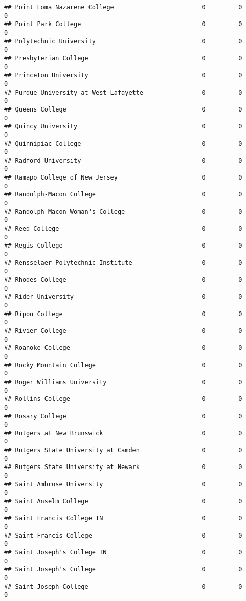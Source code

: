 \documentclass[
]{article}
\begin{document}
\begin{verbatim}
## Point Loma Nazarene College                        0         0         0
## Point Park College                                 0         0         0
## Polytechnic University                             0         0         0
## Presbyterian College                               0         0         0
## Princeton University                               0         0         0
## Purdue University at West Lafayette                0         0         0
## Queens College                                     0         0         0
## Quincy University                                  0         0         0
## Quinnipiac College                                 0         0         0
## Radford University                                 0         0         0
## Ramapo College of New Jersey                       0         0         0
## Randolph-Macon College                             0         0         0
## Randolph-Macon Woman's College                     0         0         0
## Reed College                                       0         0         0
## Regis College                                      0         0         0
## Rensselaer Polytechnic Institute                   0         0         0
## Rhodes College                                     0         0         0
## Rider University                                   0         0         0
## Ripon College                                      0         0         0
## Rivier College                                     0         0         0
## Roanoke College                                    0         0         0
## Rocky Mountain College                             0         0         0
## Roger Williams University                          0         0         0
## Rollins College                                    0         0         0
## Rosary College                                     0         0         0
## Rutgers at New Brunswick                           0         0         0
## Rutgers State University at Camden                 0         0         0
## Rutgers State University at Newark                 0         0         0
## Saint Ambrose University                           0         0         0
## Saint Anselm College                               0         0         0
## Saint Francis College IN                           0         0         0
## Saint Francis College                              0         0         0
## Saint Joseph's College IN                          0         0         0
## Saint Joseph's College                             0         0         0
## Saint Joseph College                               0         0         0

\end{verbatim}
\end{document}
